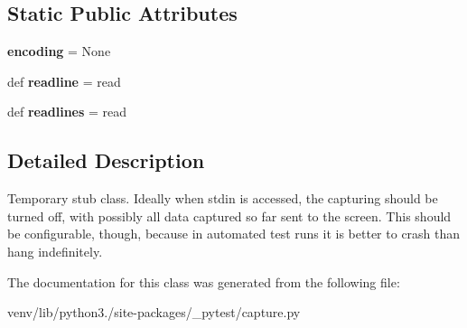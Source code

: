 \subsection*{Static Public Attributes}
\begin{DoxyCompactItemize}
\item 
\mbox{\label{class__pytest_1_1capture_1_1_dont_read_from_input_a45441648f10fbadad87d38755402e41c}} 
{\bfseries encoding} = None
\item 
\mbox{\label{class__pytest_1_1capture_1_1_dont_read_from_input_a515fb9959a828fa69b40704e05bfd9a7}} 
def {\bfseries readline} = read
\item 
\mbox{\label{class__pytest_1_1capture_1_1_dont_read_from_input_a5de446f54804d8ecb82a389aeec2c4f9}} 
def {\bfseries readlines} = read
\end{DoxyCompactItemize}


\subsection{Detailed Description}
\begin{DoxyVerb}Temporary stub class.  Ideally when stdin is accessed, the
capturing should be turned off, with possibly all data captured
so far sent to the screen.  This should be configurable, though,
because in automated test runs it is better to crash than
hang indefinitely.
\end{DoxyVerb}
 

The documentation for this class was generated from the following file\+:\begin{DoxyCompactItemize}
\item 
venv/lib/python3./site-\/packages/\+\_\+pytest/capture.\+py\end{DoxyCompactItemize}
